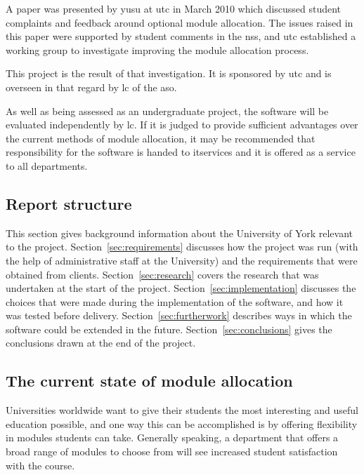 \documentclass[draft]{scrartcl}
\begin{document}
A paper was presented by \gls{yusu} at \gls{utc} in March 2010 which discussed
student complaints and feedback around optional module allocation. The issues
raised in this paper were supported by student comments in the \gls{nss}, and
\gls{utc} established a working group to investigate improving the module
allocation process.

This project is the result of that investigation. It is sponsored by \gls{utc}
and is overseen in that regard by \gls{lc} of the \gls{aso}.

As well as being assessed as an undergraduate project, the software will be
evaluated independently by \gls{lc}. If it is judged to provide sufficient
advantages over the current methods of module allocation, it may be
recommended that responsibility for the software is handed to
\gls{itservices} and it is offered as a service to all departments.

\subsection{Report structure}

This section gives background information about the University of York
relevant to the project. Section~\ref{sec:requirements} discusses how the
project was run (with the help of administrative staff at the University) and
the requirements that were obtained from clients. Section~\ref{sec:research}
covers the research that was undertaken at the start of the project.
Section~\ref{sec:implementation} discusses the choices that were made during
the implementation of the software, and how it was tested before delivery.
Section~\ref{sec:furtherwork} describes ways in which the software could be
extended in the future. Section~\ref{sec:conclusions} gives the conclusions
drawn at the end of the project.

\subsection{The current state of module allocation}


Universities worldwide want to give their students the most interesting and
useful education possible, and one way this can be accomplished is by offering
flexibility in modules students can take. Generally speaking, a department
that offers a broad range of modules to choose from will see increased student
satisfaction with the course.
\end{document}
